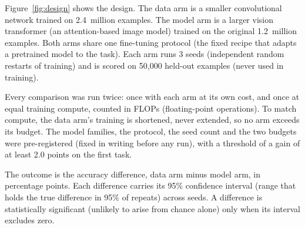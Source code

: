 \documentclass[pdflatex,sn-mathphys-num]{sn-jnl}
\newcommand{\lit}[1]{#1}
\newcommand{\nHeldout}{50{,}000}
\newcommand{\nSeeds}{3}
\newcommand{\nTrainBase}{1.2~million}
\newcommand{\nTrainData}{2.4~million}
\begin{document}
Figure~\ref{fig:design} shows the design. The data arm is a smaller convolutional network
\cite{he2015} trained on \nTrainData{} examples. The model arm is a larger vision
transformer (an attention-based image model) \cite{dosovitskiy2020} trained on the
original \nTrainBase{} examples. Both arms share one fine-tuning protocol (the fixed recipe
that adapts a pretrained model to the task). Each arm runs \nSeeds{} seeds (independent
random restarts of training) and is scored on \nHeldout{} held-out examples (never used in
training).

Every comparison was run twice: once with each arm at its own cost, and once at equal
training compute, counted in FLOPs (floating-point operations). To match compute, the data
arm's training is shortened, never extended, so no arm exceeds its budget. The model
families, the protocol, the seed count and the two budgets were pre-registered (fixed in
writing before any run), with a threshold of a gain of at least \lit{2.0} points on the
first task.

The outcome is the accuracy difference, data arm minus model arm, in percentage points.
Each difference carries its \lit{95}\% confidence interval (range that holds the true
difference in \lit{95}\% of repeats) across seeds. A difference is statistically
significant (unlikely to arise from chance alone) only when its interval excludes zero.
\end{document}
